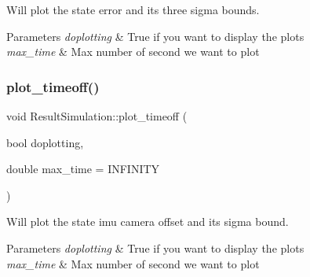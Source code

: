 Will plot the state error and its three sigma bounds. 


\begin{DoxyParams}{Parameters}
{\em doplotting} & True if you want to display the plots \\
\hline
{\em max\+\_\+time} & Max number of second we want to plot \\
\hline
\end{DoxyParams}
\mbox{\label{classov__eval_1_1ResultSimulation_a3d927f6bd6eaf6eba2b5a067920ef662}} 
\subsubsection{\texorpdfstring{plot\+\_\+timeoff()}{plot\_timeoff()}}
{\footnotesize\ttfamily void Result\+Simulation\+::plot\+\_\+timeoff (\begin{DoxyParamCaption}\item[{bool}]{doplotting,  }\item[{double}]{max\+\_\+time = {\ttfamily INFINITY} }\end{DoxyParamCaption})}



Will plot the state imu camera offset and its sigma bound. 


\begin{DoxyParams}{Parameters}
{\em doplotting} & True if you want to display the plots \\
\hline
{\em max\+\_\+time} & Max number of second we want to plot \\
\hline
\end{DoxyParams}

